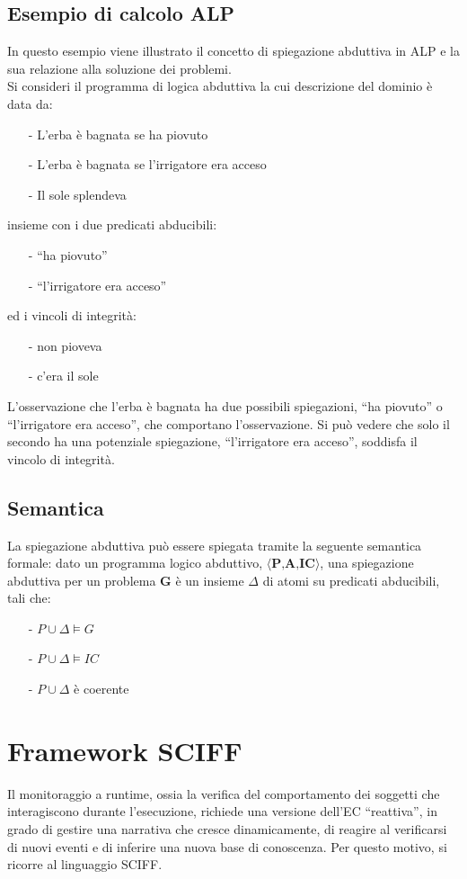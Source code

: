 \documentclass[a4paper,12pt]{report}
\newcommand{\virgolette}[1]{``#1''}
\begin{document}
\subsection{Esempio di calcolo ALP}
In questo esempio viene illustrato il concetto di spiegazione abduttiva in ALP e la sua relazione alla soluzione dei problemi.\\
Si consideri il programma di logica abduttiva la cui descrizione del dominio è data da:
\begin{itemize}
    \item[-]L'erba è bagnata se ha piovuto
    \item[-]L'erba è bagnata se l'irrigatore era acceso
    \item[-]Il sole splendeva
\end{itemize}
insieme con i due predicati abducibili:
\begin{itemize}
    \item[-] \virgolette{ha piovuto}
    \item[-] \virgolette{l'irrigatore era acceso}
\end{itemize}
ed i vincoli di integrità:
\begin{itemize}
    \item[-]non pioveva
    \item[-]c'era il sole
\end{itemize}
L'osservazione che l'erba è bagnata ha due possibili spiegazioni, \virgolette{ha piovuto} o \virgolette{l'irrigatore era acceso}, che comportano l'osservazione. Si può vedere che solo il secondo ha una potenziale spiegazione, \virgolette{l'irrigatore era acceso}, soddisfa il vincolo di integrità.
\subsection{Semantica}
La spiegazione abduttiva può essere spiegata tramite la seguente semantica formale: dato un programma logico abduttivo, $\langle \textbf{P,A,IC} \rangle$, una spiegazione abduttiva per un problema \textbf{G} è un insieme $\Delta$ di atomi su predicati abducibili, tali che:
\begin{itemize}
    \item[-]$P \cup \Delta \models G$
    \item[-]$P \cup \Delta \models IC$
    \item[-]$P \cup \Delta$ è coerente
\end{itemize}
\newpage
\section{Framework SCIFF}
Il monitoraggio a runtime, ossia la verifica del comportamento dei soggetti che interagiscono durante l'esecuzione, richiede una versione dell'EC \virgolette{reattiva}, in grado di gestire una narrativa che cresce dinamicamente, di reagire al verificarsi di nuovi eventi e di inferire una nuova base di conoscenza. Per questo motivo, si ricorre al linguaggio SCIFF.
\end{document}
